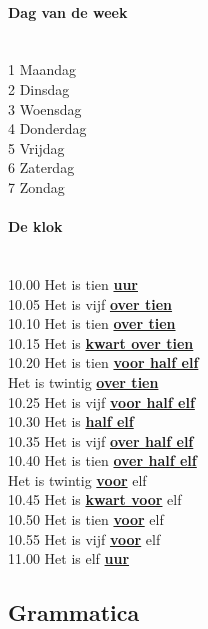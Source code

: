 \documentclass[a4paper,14pt]{extarticle}
\newcommand{\emp}[1]{\underline{\textbf{#1}}}
\begin{document}
\begin{paracol}{2}
\paragraph{Dag van de week}
\hfill \\
1 Maandag \\
2 Dinsdag \\
3 Woensdag \\
4 Donderdag \\
5 Vrijdag \\
6 Zaterdag \\
7 Zondag \\
\paragraph{De klok}
\hfill \\
10.00 Het is tien \emp{uur} \\
10.05 Het is vijf \emp{over tien} \\
10.10 Het is tien \emp{over tien} \\
10.15 Het is \emp{kwart over tien} \\
10.20 Het is tien \emp{voor half elf} \\
\phantom{10.20 }Het is twintig \emp{over tien} \\
10.25 Het is vijf \emp{voor half elf} \\
10.30 Het is \emp{half elf} \\
10.35 Het is vijf \emp{over half elf} \\
10.40 Het is tien \emp{over half elf} \\
\phantom{10.20 }Het is twintig \emp{voor} elf \\
10.45 Het is \emp{kwart voor} elf \\
10.50 Het is tien \emp{voor} elf \\
10.55 Het is vijf \emp{voor} elf \\
11.00 Het is elf \emp{uur} \\
\end{paracol}
\newpage
\subsection{Grammatica}
\end{document}
